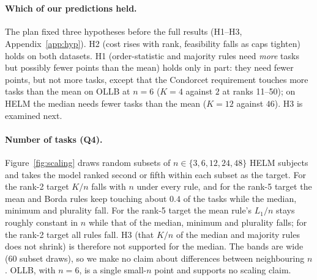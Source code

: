 \documentclass{article}
\begin{document}
\begin{table}[t]
\caption{Median investment to become first among feasible targets, by rank stratum and rule, primary caps: OLLB (\texttt{emp99}, top) and HELM (\texttt{emp99T}, bottom). ``feas.'' = feasible targets / targets in the stratum; $K$, $L_1$ with 95\% bootstrap intervals over targets; the last column is the median ratio of $L_1$ to the mean rule over targets feasible under both. OLLB Borda and Condorcet use the 50 best targets only. Generated by \texttt{figures/src/tables.py}.}
\label{tab:T3}
\centering\scriptsize
\resizebox{\linewidth}{!}{}\\[4pt]
\resizebox{\linewidth}{!}{}
\end{table}

\paragraph{Which of our predictions held.}
The plan fixed three hypotheses before the full results (H1--H3, Appendix~\ref{app:hyp}). H2 (cost rises with rank, feasibility falls as caps tighten) holds on both datasets. H1 (order-statistic and majority rules need \emph{more} tasks but possibly fewer points than the mean) holds only in part: they need fewer points, but not more tasks, except that the Condorcet requirement touches more tasks than the mean on OLLB at $n=6$ ($K=4$ against $2$ at ranks 11--50); on HELM the median needs fewer tasks than the mean ($K=12$ against $46$). H3 is examined next.

\paragraph{Number of tasks (Q4).}
Figure~\ref{fig:scaling} draws random subsets of $n\in\{3,6,12,24,48\}$ HELM subjects and takes the model ranked second or fifth within each subset as the target. For the rank-2 target $K/n$ falls with $n$ under every rule, and for the rank-5 target the mean and Borda rules keep touching about $0.4$ of the tasks while the median, minimum and plurality fall. For the rank-5 target the mean rule's $L_1/n$ stays roughly constant in $n$ while that of the median, minimum and plurality falls; for the rank-2 target all rules fall. H3 (that $K/n$ of the median and majority rules does not shrink) is therefore not supported for the median. The bands are wide (60 subset draws), so we make no claim about differences between neighbouring $n$. OLLB, with $n=6$, is a single small-$n$ point and supports no scaling claim.
\end{document}
